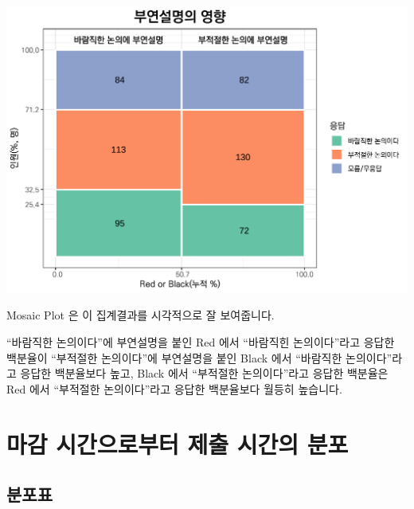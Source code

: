 \documentclass[
]{book}
\begin{document}
\includegraphics{_main_files/figure-latex/unnamed-chunk-26-1.pdf}

Mosaic Plot 은 이 집계결과를 시각적으로 잘 보여줍니다.

``바람직한 논의이다''에 부연설명을 붙인 Red 에서 ``바람직힌 논의이다''라고 응답한 백분율이 ``부적절한 논의이다''에 부연설명을 붙인 Black 에서 ``바람직한 논의이다''라고 응답한 백분율보다 높고, Black 에서 ``부적절한 논의이다''라고 응답한 백분율은 Red 에서 ``부적절한 논의이다''라고 응답한 백분율보다 월등히 높습니다.

\section{마감 시간으로부터 제출 시간의 분포}\label{uxb9c8uxac10-uxc2dcuxac04uxc73cuxb85cuxbd80uxd130-uxc81cuxcd9c-uxc2dcuxac04uxc758-uxbd84uxd3ec}

\subsection{분포표}\label{uxbd84uxd3ecuxd45c-1}
\end{document}
